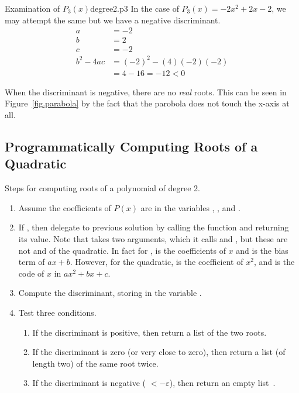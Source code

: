 \begin{example}{Examination of $P_3(x)$}{degree2.p3}
  In the case of $P_3(x) = -2x^2 + 2x -2$, we may attempt the same but we have a negative discriminant.
  \begin{align*}
    a&=-2\\
    b&=2\\
    c&=-2\\
    b^2 - 4a c  &=(-2)^2 - (4)(-2)(-2)\\
    &= 4 - 16 = -12 < 0
  \end{align*}

When the discriminant
is negative, there are no \emph{real} roots.  This can be seen in
Figure~\ref{fig.parabola} by the fact that the parobola does not
touch the x-axis at all.
\end{example}

\subsection{Programmatically Computing Roots of a Quadratic}

Steps for computing roots of a polynomial of degree 2.
\begin{enumerate}
\item Assume the coefficients of $P(x)$ are in the variables , , and .
\item If , then delegate to previous solution by calling the function  and returning its value.  Note that  takes two arguments, which it calls  and , but these are not  and  of the quadratic.   In fact for ,  is the coefficients of $x$ and  is the bias term of $a x + b$.  However, for the quadratic,  is the coefficient of $x^2$, and  is the code of $x$ in $a x^2 + b x + c$.
\item Compute the discriminant, storing in the variable .
\item Test three conditions.
  \begin{enumerate}
  \item If the discriminant is positive, then return a list of the two roots.
  \item If the discriminant is zero (or very close to zero), then return a list (of length two) of the same root twice.
  \item If the discriminant is negative ( $< -\varepsilon$), then return an empty list~\code{[]}.
  \end{enumerate}
\end{enumerate}


